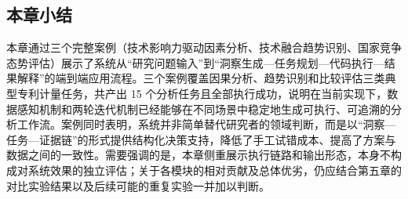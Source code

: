 \subsection{本章小结}

本章通过三个完整案例（技术影响力驱动因素分析、技术融合趋势识别、国家竞争态势评估）展示了系统从“研究问题输入”到“洞察生成—任务规划—代码执行—结果解释”的端到端应用流程。三个案例覆盖因果分析、趋势识别和比较评估三类典型专利计量任务，共产出 15 个分析任务且全部执行成功，说明在当前实现下，数据感知机制和两轮迭代机制已经能够在不同场景中稳定地生成可执行、可追溯的分析工作流。案例同时表明，系统并非简单替代研究者的领域判断，而是以“洞察—任务—证据链”的形式提供结构化决策支持，降低了手工试错成本、提高了方案与数据之间的一致性。需要强调的是，本章侧重展示执行链路和输出形态，本身不构成对系统效果的独立评估；关于各模块的相对贡献及总体优劣，仍应结合第五章的对比实验结果以及后续可能的重复实验一并加以判断。
